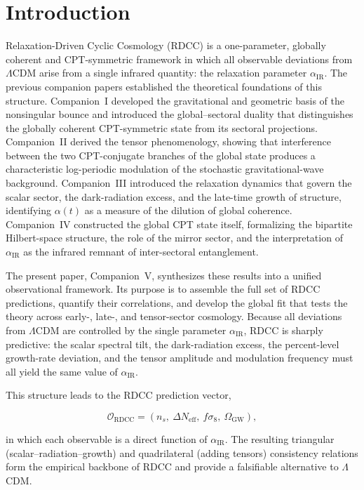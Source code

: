 \documentclass[11pt,a4paper]{article}
\begin{document}
\tableofcontents
\newpage

\section{Introduction}

Relaxation-Driven Cyclic Cosmology (RDCC) is a one-parameter, globally coherent and
CPT-symmetric framework in which all observable deviations from $\Lambda$CDM arise from
a single infrared quantity: the relaxation parameter $\alpha_{\mathrm{IR}}$. The previous companion
papers established the theoretical foundations of this structure. Companion~I developed the
gravitational and geometric basis of the nonsingular bounce and introduced the global--sectoral
duality that distinguishes the globally coherent CPT-symmetric state from its sectoral
projections. Companion~II derived the tensor phenomenology, showing that interference between
the two CPT-conjugate branches of the global state produces a characteristic log-periodic
modulation of the stochastic gravitational-wave background. Companion~III introduced the
relaxation dynamics that govern the scalar sector, the dark-radiation excess, and the late-time
growth of structure, identifying $\alpha(t)$ as a measure of the dilution of global coherence.
Companion~IV constructed the global CPT state itself, formalizing the bipartite Hilbert-space
structure, the role of the mirror sector, and the interpretation of $\alpha_{\mathrm{IR}}$ as the infrared
remnant of inter-sectoral entanglement.

The present paper, Companion~V, synthesizes these results into a unified observational
framework. Its purpose is to assemble the full set of RDCC predictions, quantify their correlations,
and develop the global fit that tests the theory across early-, late-, and tensor-sector cosmology.
Because all deviations from $\Lambda$CDM are controlled by the single parameter
$\alpha_{\mathrm{IR}}$, RDCC is sharply predictive: the scalar spectral tilt, the dark-radiation excess,
the percent-level growth-rate deviation, and the tensor amplitude and modulation frequency must
all yield the same value of $\alpha_{\mathrm{IR}}$.

This structure leads to the RDCC prediction vector,


\[
\mathcal{O}_{\mathrm{RDCC}} = (n_s,\ \Delta N_{\mathrm{eff}},\ f\sigma_8,\ \Omega_{\mathrm{GW}}),
\]


in which each observable is a direct function of $\alpha_{\mathrm{IR}}$. The resulting triangular
(scalar--radiation--growth) and quadrilateral (adding tensors) consistency relations form the
empirical backbone of RDCC and provide a falsifiable alternative to $\Lambda$CDM.
\end{document}
